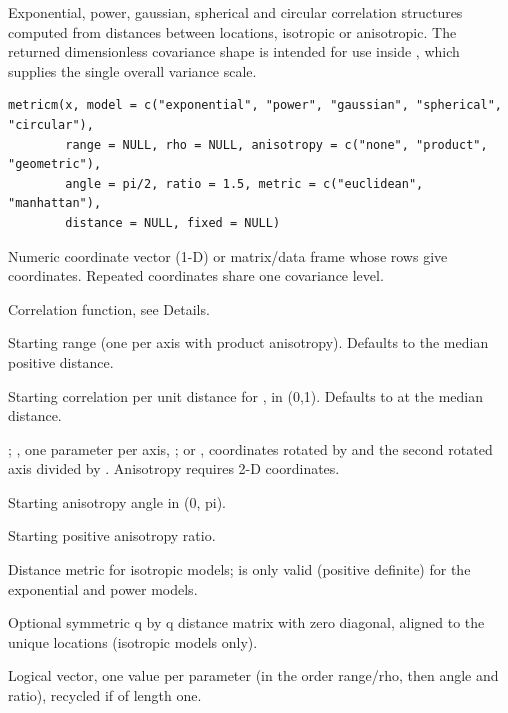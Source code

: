 \documentclass[a4paper]{book}
\begin{document}
%
\begin{Description}\relax
Exponential, power, gaussian, spherical and circular correlation structures
computed from distances between locations, isotropic or anisotropic. The
returned dimensionless covariance shape is intended for use inside
, which supplies the single overall variance scale.
\end{Description}
%
\begin{Usage}
\begin{verbatim}
metricm(x, model = c("exponential", "power", "gaussian", "spherical", "circular"),
        range = NULL, rho = NULL, anisotropy = c("none", "product", "geometric"),
        angle = pi/2, ratio = 1.5, metric = c("euclidean", "manhattan"),
        distance = NULL, fixed = NULL)
\end{verbatim}
\end{Usage}
%
\begin{Arguments}
\begin{ldescription}
\item[\code{x}] Numeric coordinate vector (1-D) or matrix/data frame whose rows give coordinates. Repeated coordinates share one covariance level.
\item[\code{model}] Correlation function, see Details.
\item[\code{range}] Starting range \eqn{\phi}{} (one per axis with product anisotropy). Defaults to the median positive distance.
\item[\code{rho}] Starting correlation per unit distance for , in (0,1). Defaults to  at the median distance.
\item[\code{anisotropy}] ; , one parameter per axis, ; or , coordinates rotated by  and the second rotated axis divided by . Anisotropy requires 2-D coordinates.
\item[\code{angle}] Starting anisotropy angle in (0, pi).
\item[\code{ratio}] Starting positive anisotropy ratio.
\item[\code{metric}] Distance metric for isotropic models;  is only valid (positive definite) for the exponential and power models.
\item[\code{distance}] Optional symmetric q by q distance matrix with zero diagonal, aligned to the unique locations (isotropic models only).
\item[\code{fixed}] Logical vector, one value per parameter (in the order range/rho, then angle and ratio), recycled if of length one.
\end{ldescription}
\end{Arguments}
\end{document}
